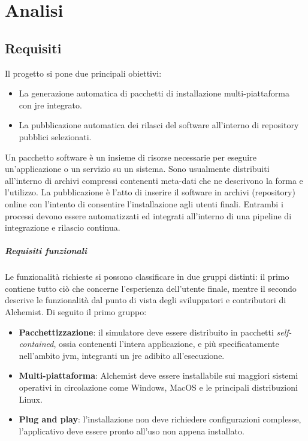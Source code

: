
\chapter{Analisi}

\section{Requisiti}

Il progetto si pone due principali obiettivi:
\begin{itemize}
	\item La generazione automatica di pacchetti di installazione multi-piattaforma \\ con \ac{jre} integrato.
	\item La pubblicazione automatica dei rilasci del software all'interno di repository pubblici selezionati.
\end{itemize}
Un pacchetto software è un insieme di risorse necessarie per eseguire un'applicazione o un servizio su un sistema. Sono usualmente distribuiti all'interno di archivi compressi contenenti meta-dati che ne descrivono la forma e l'utilizzo. La pubblicazione è l'atto di inserire il software in archivi (repository) online con l'intento di consentire l'installazione agli utenti finali. Entrambi i processi devono essere automatizzati ed integrati all'interno di una pipeline di integrazione e rilascio continua.

\paragraph{Requisiti funzionali}

Le funzionalità richieste si possono classificare in due gruppi distinti: il primo contiene tutto ciò che concerne l'esperienza dell'utente finale, mentre il secondo descrive le funzionalità dal punto di vista degli sviluppatori e contributori di Alchemist. Di seguito il primo gruppo:
\begin{itemize}
	\item \textbf{Pacchettizzazione}: il simulatore deve essere distribuito in pacchetti \textit{self-contained}, ossia contenenti l'intera applicazione, e più specificatamente nell'ambito \ac{jvm}, integranti un \ac{jre} adibito all'esecuzione.
	\item \textbf{Multi-piattaforma}: Alchemist deve essere installabile sui maggiori sistemi operativi in circolazione come Windows, MacOS e le principali distribuzioni Linux.
	\item \textbf{Plug and play}: l'installazione non deve richiedere configurazioni complesse, l'applicativo deve essere pronto all'uso non appena installato.
\end{itemize}

